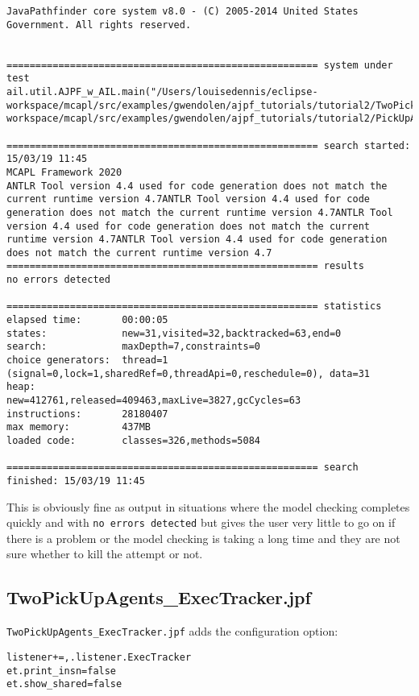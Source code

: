 \begin{verbatim}
JavaPathfinder core system v8.0 - (C) 2005-2014 United States Government. All rights reserved.


====================================================== system under test
ail.util.AJPF_w_AIL.main("/Users/louisedennis/eclipse-workspace/mcapl/src/examples/gwendolen/ajpf_tutorials/tutorial2/TwoPickUpAgents.ail","/Users/louisedennis/eclipse-workspace/mcapl/src/examples/gwendolen/ajpf_tutorials/tutorial2/PickUpAgent.psl","1")

====================================================== search started: 15/03/19 11:45
MCAPL Framework 2020
ANTLR Tool version 4.4 used for code generation does not match the current runtime version 4.7ANTLR Tool version 4.4 used for code generation does not match the current runtime version 4.7ANTLR Tool version 4.4 used for code generation does not match the current runtime version 4.7ANTLR Tool version 4.4 used for code generation does not match the current runtime version 4.7
====================================================== results
no errors detected

====================================================== statistics
elapsed time:       00:00:05
states:             new=31,visited=32,backtracked=63,end=0
search:             maxDepth=7,constraints=0
choice generators:  thread=1 (signal=0,lock=1,sharedRef=0,threadApi=0,reschedule=0), data=31
heap:               new=412761,released=409463,maxLive=3827,gcCycles=63
instructions:       28180407
max memory:         437MB
loaded code:        classes=326,methods=5084

====================================================== search finished: 15/03/19 11:45
\end{verbatim}

This is obviously fine as output in situations where the model checking completes quickly and with \texttt{no errors detected} but gives the user very little to go on if there is a problem or the model checking is taking a long time and they are not sure whether to kill the attempt or not.

\subsection{TwoPickUpAgents\_ExecTracker.jpf}

\texttt{TwoPickUpAgents\_ExecTracker.jpf} adds the configuration option:

\begin{verbatim}
listener+=,.listener.ExecTracker
et.print_insn=false
et.show_shared=false
\end{verbatim}

